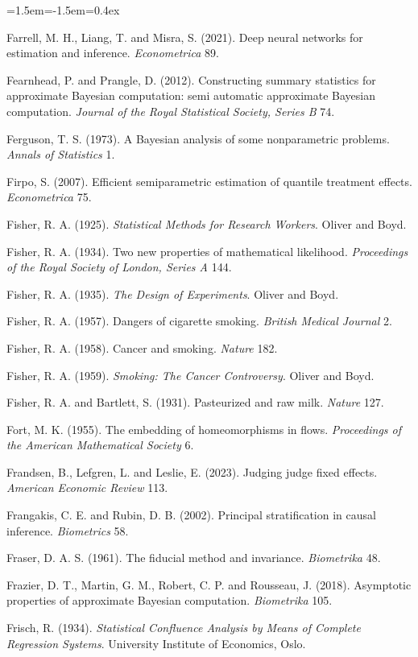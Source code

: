 \begin{list}{}{\leftmargin=1.5em\itemindent=-1.5em\itemsep=0.4ex}
\item Farrell, M. H., Liang, T. and Misra, S. (2021). Deep neural networks for estimation and inference. \emph{Econometrica} 89.
\item Fearnhead, P. and Prangle, D. (2012). Constructing summary statistics for approximate Bayesian computation: semi automatic approximate Bayesian computation. \emph{Journal of the Royal Statistical Society, Series B} 74.
\item Ferguson, T. S. (1973). A Bayesian analysis of some nonparametric problems. \emph{Annals of Statistics} 1.
\item Firpo, S. (2007). Efficient semiparametric estimation of quantile treatment effects. \emph{Econometrica} 75.
\item Fisher, R. A. (1925). \emph{Statistical Methods for Research Workers}. Oliver and Boyd.
\item Fisher, R. A. (1934). Two new properties of mathematical likelihood. \emph{Proceedings of the Royal Society of London, Series A} 144.
\item Fisher, R. A. (1935). \emph{The Design of Experiments}. Oliver and Boyd.
\item Fisher, R. A. (1957). Dangers of cigarette smoking. \emph{British Medical Journal} 2.
\item Fisher, R. A. (1958). Cancer and smoking. \emph{Nature} 182.
\item Fisher, R. A. (1959). \emph{Smoking: The Cancer Controversy}. Oliver and Boyd.
\item Fisher, R. A. and Bartlett, S. (1931). Pasteurized and raw milk. \emph{Nature} 127.
\item Fort, M. K. (1955). The embedding of homeomorphisms in flows. \emph{Proceedings of the American Mathematical Society} 6.
\item Frandsen, B., Lefgren, L. and Leslie, E. (2023). Judging judge fixed effects. \emph{American Economic Review} 113.
\item Frangakis, C. E. and Rubin, D. B. (2002). Principal stratification in causal inference. \emph{Biometrics} 58.
\item Fraser, D. A. S. (1961). The fiducial method and invariance. \emph{Biometrika} 48.
\item Frazier, D. T., Martin, G. M., Robert, C. P. and Rousseau, J. (2018). Asymptotic properties of approximate Bayesian computation. \emph{Biometrika} 105.
\item Frisch, R. (1934). \emph{Statistical Confluence Analysis by Means of Complete Regression Systems}. University Institute of Economics, Oslo.

\end{list}
